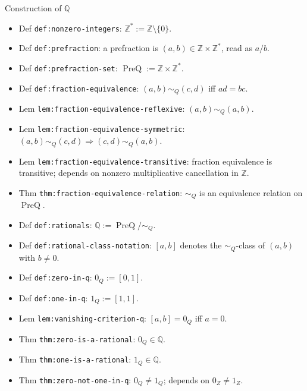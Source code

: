 \begin{topicbox}{Construction of \texorpdfstring{$\mathbb{Q}$}{Q}}
\begin{itemize}
  \item Def \texttt{def:nonzero-integers}: $\mathbb{Z}^{*}:=\mathbb{Z}\setminus\{0\}$.
  \item Def \texttt{def:prefraction}: a prefraction is $(a,b)\in\mathbb{Z}\times\mathbb{Z}^{*}$, read as $a/b$.
  \item Def \texttt{def:prefraction-set}: $\operatorname{PreQ}:=\mathbb{Z}\times\mathbb{Z}^{*}$.
  \item Def \texttt{def:fraction-equivalence}: $(a,b)\sim_Q(c,d)$ iff $a d=b c$.
  \item Lem \texttt{lem:fraction-equivalence-reflexive}: $(a,b)\sim_Q(a,b)$.
  \item Lem \texttt{lem:fraction-equivalence-symmetric}: $(a,b)\sim_Q(c,d)\Rightarrow(c,d)\sim_Q(a,b)$.
  \item Lem \texttt{lem:fraction-equivalence-transitive}: fraction equivalence is transitive; depends on nonzero multiplicative cancellation in $\mathbb{Z}$.
  \item Thm \texttt{thm:fraction-equivalence-relation}: $\sim_Q$ is an equivalence relation on $\operatorname{PreQ}$.
  \item Def \texttt{def:rationals}: $\mathbb{Q}:=\operatorname{PreQ}/\sim_Q$.
  \item Def \texttt{def:rational-class-notation}: $[a,b]$ denotes the $\sim_Q$-class of $(a,b)$ with $b\ne0$.
  \item Def \texttt{def:zero-in-q}: $0_Q:=[0,1]$.
  \item Def \texttt{def:one-in-q}: $1_Q:=[1,1]$.
  \item Lem \texttt{lem:vanishing-criterion-q}: $[a,b]=0_Q$ iff $a=0$.
  \item Thm \texttt{thm:zero-is-a-rational}: $0_Q\in\mathbb{Q}$.
  \item Thm \texttt{thm:one-is-a-rational}: $1_Q\in\mathbb{Q}$.
  \item Thm \texttt{thm:zero-not-one-in-q}: $0_Q\ne1_Q$; depends on $0_Z\ne1_Z$.
\end{itemize}
\end{topicbox}

